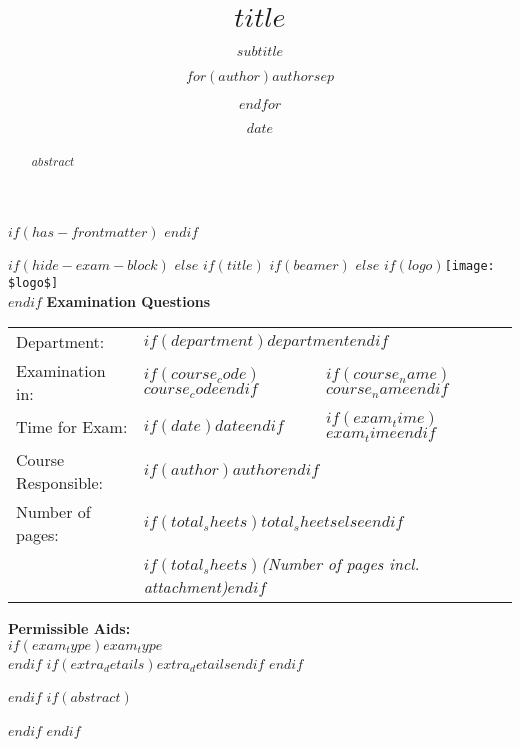 \documentclass[
$if(fontsize)$$fontsize$,$endif$%
$if(lang)$$babel-lang$,$endif$%
$if(papersize)$$papersize$paper,$endif$%
$for(classoption)$$classoption$$sep$,$endfor$]%
{article}%
\title{$title$}
\subtitle{$subtitle$}
\author{$for(author)$$author$$sep$ \and $endfor$}
\date{$date$}
\begin{document}
$if(has-frontmatter)$
\frontmatter
$endif$

$if(hide-exam-block)$
$else$
$if(title)$
$if(beamer)$
\frame{\titlepage}
$else$
$if(logo)${\centering\texttt{[image: \$logo\$]}\\\vspace{24pt}}$endif$
\doublespacing
\textbf{\Huge Examination Questions}
\vspace{10pt}\\
\begin{tabularx}{\textwidth}{llX}
\toprule
Department: & 
  \multicolumn{2}{l}{$if(department)$\textbf{$department$}$endif$} \\
\cmidrule(r){2-3}
Examination in: & 
  $if(course_code)$\textbf{$course_code$}$endif$& 
  $if(course_name)$\textbf{$course_name$}$endif$\\
\cmidrule(r){2-3}
Time for Exam: & 
  $if(date)$\textbf{$date$}$endif$ & 
  $if(exam_time)$\textbf{$exam_time$}$endif$\\
\cmidrule(r){2-3}
Course Responsible: & \multicolumn{2}{l}{$if(author)$\textbf{$author$}$endif$} \\
\cmidrule(r){2-3}
Number of pages: & \multicolumn{2}{l}{$if(total_sheets)$\textbf{$total_sheets$}$else$\textbf{\pageref{LastPage}}$endif$} \\
& \multicolumn{2}{l}{$if(total_sheets)$\textit{(Number of pages incl. attachment)}$endif$} \\
\bottomrule
\end{tabularx}
\vspace{10pt}
\newline
\textbf{\large Permissible Aids:}\\
$if(exam_type)$\textbf{$exam_type$}\\$endif$
$if(extra_details)$$extra_details$$endif$
$endif$

$endif$
$if(abstract)$
\begin{abstract}
$abstract$
\end{abstract}
$endif$
$endif$
\end{document}
